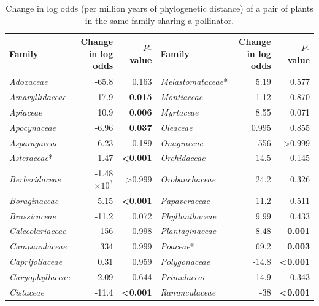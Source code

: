 \documentclass[12pt]{article}
\begin{document}
  \begin{table}[!h]
  \caption{
  \small Change in log odds (per million years of phylogenetic distance) of a pair of plants in the same family sharing a pollinator.}
  \small
  \label{family_slopes_pp}
  \begin{tabular}{|l  rr|| l rr|}
    \hline
    Family  & Change in log odds & $P$-value & Family  & Change in log odds & $P$-value \\
    \hline
    \emph{Adoxaceae}  & -65.8 &  0.163  &     \emph{Melastomataceae}*   & 5.19  &  0.577 \\
    \emph{Amaryllidaceae}   & -17.9 &  \textbf{0.015} &     \emph{Montiaceae}   & -1.12 &  0.870 \\
    \emph{Apiaceae}   & 10.9  &  \textbf{0.006} &     \emph{Myrtaceae}  & 8.55  &  0.071 \\
    \emph{Apocynaceae}  & -6.96 &  \textbf{0.037} &     \emph{Oleaceae}   & 0.995 &  0.855 \\
    \emph{Asparagaceae}   & -6.23 &  0.189  &     \emph{Onagraceae}   & -556  &  \textgreater0.999 \\
    \emph{Asteraceae}*  & -1.47 &  \textbf{\textless0.001}  &     \emph{Orchidaceae}  & -14.5 &  0.145 \\
    \emph{Berberidaceae}  &   -1.48$\times10^3$   &  \textgreater0.999  &     \emph{Orobanchaceae}  & 24.2  &  0.326 \\
    \emph{Boraginaceae}   & -5.15 &  \textbf{\textless0.001}  &     \emph{Papaveraceae}   & -11.2 &  0.511 \\
    \emph{Brassicaceae}   & -11.2 &  0.072  &     \emph{Phyllanthaceae}   & 9.99  &  0.433 \\
    \emph{Calceolariaceae}  & 156 &  0.998  &     \emph{Plantaginaceae}   & -8.48 &  \textbf{0.001} \\
    \emph{Campanulaceae}  & 334 &  0.999  &     \emph{Poaceae}*   & 69.2  &  \textbf{0.003} \\
    \emph{Caprifoliaceae}   & 0.31  &  0.959  &     \emph{Polygonaceae}   & -14.8 &  \textbf{\textless0.001} \\
    \emph{Caryophyllaceae}  & 2.09  &  0.644  &     \emph{Primulaceae}  & 14.9  &  0.343 \\
    \emph{Cistaceae}  & -11.4 &  \textbf{\textless0.001}  &     \emph{Ranunculaceae}  & -38 &  \textbf{\textless0.001} \\

\end{tabular}
\end{table}
\end{document}
